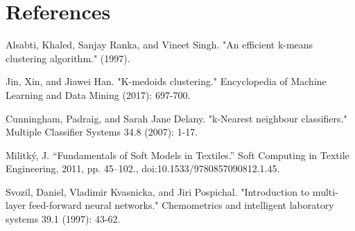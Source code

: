 \documentclass[twoside,11pt]{article}
\begin{document}





\section{References}
    \makebox[.5cm]{[1]} Alsabti, Khaled, Sanjay Ranka, and Vineet Singh. "An efficient k-means clustering algorithm." (1997).\par
    \makebox[.5cm]{[2]} Jin, Xin, and Jiawei Han. "K-medoids clustering." Encyclopedia of Machine Learning and Data Mining (2017): 697-700.\par
    \makebox[.5cm]{[4]} Cunningham, Padraig, and Sarah Jane Delany. "k-Nearest neighbour classifiers." Multiple Classifier Systems 34.8 (2007): 1-17.\par
    \makebox[.5cm]{[5]} Militký, J. “Fundamentals of Soft Models in Textiles.” Soft Computing in Textile Engineering, 2011, pp. 45–102., doi:10.1533/9780857090812.1.45.\par
    \makebox[.5cm]{[6]} Svozil, Daniel, Vladimir Kvasnicka, and Jiri Pospichal. "Introduction to multi-layer feed-forward neural networks." Chemometrics and intelligent laboratory systems 39.1 (1997): 43-62. \par
\end{document}
